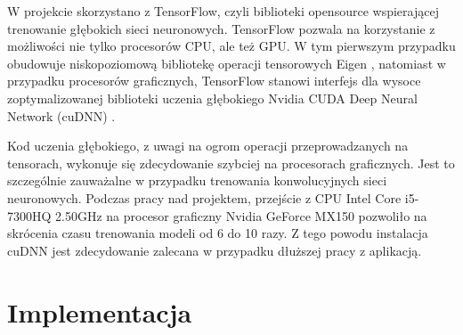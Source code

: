 W projekcie skorzystano z TensorFlow, czyli biblioteki opensource wspierającej trenowanie głębokich sieci neuronowych. TensorFlow pozwala na korzystanie z możliwości nie tylko procesorów CPU, ale też GPU. W tym pierwszym przypadku obudowuje niskopoziomową bibliotekę operacji tensorowych Eigen \cite{Eigen}, natomiast w przypadku procesorów graficznych, TensorFlow stanowi interfejs dla wysoce zoptymalizowanej biblioteki uczenia głębokiego Nvidia CUDA Deep Neural Network (cuDNN) \cite{cuDNN}.

Kod uczenia głębokiego, z uwagi na ogrom operacji przeprowadzanych na tensorach, wykonuje się zdecydowanie szybciej na procesorach graficznych. Jest to szczególnie zauważalne w przypadku trenowania konwolucyjnych sieci neuronowych. Podczas pracy nad projektem, przejście z CPU Intel Core i5-7300HQ 2.50GHz na procesor graficzny Nvidia GeForce MX150 pozwoliło na skrócenia czasu trenowania modeli od 6 do 10 razy. Z tego powodu instalacja cuDNN jest zdecydowanie zalecana w przypadku dłuższej pracy z aplikacją.


\section{Implementacja}
